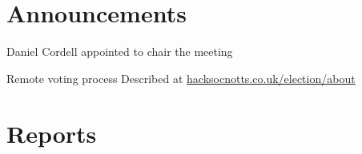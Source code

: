 \documentclass[11pt]{meetingmins}
\begin{document}
\maketitle

\section{Announcements}
\begin{items}
	\item
	Daniel Cordell appointed to chair the meeting
	
	\item
	Remote voting process
		\subitem
		Described at \href{https://hacksocnotts.co.uk/election/about}{hacksocnotts.co.uk/election/about}
\end{items}

\section{Reports}
\end{document}
